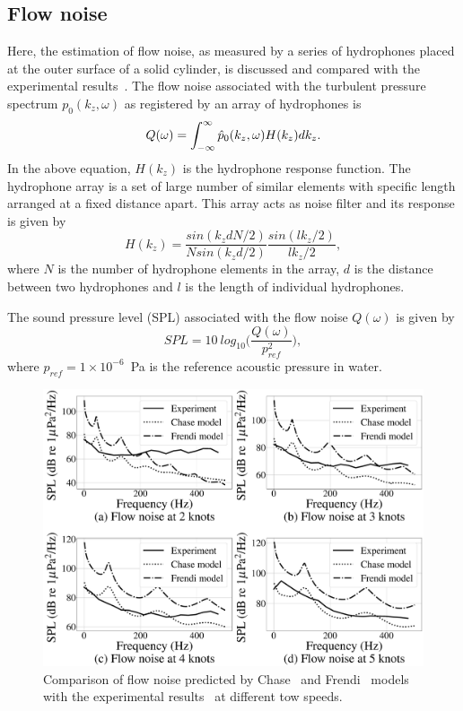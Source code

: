 \documentclass[11pt,cleanfoot]{asme2ej}
\begin{document}
\subsection{Flow noise} \label{sec:flownoise}
Here, the estimation of flow noise, as measured by a series of hydrophones placed at the outer surface of a solid cylinder, is discussed and compared with the experimental results~\cite{Unni2011}.
The flow noise associated with the turbulent pressure spectrum $p_{0}(k_{z},\omega)$ as registered by an array of hydrophones is~\cite{Unni2011} 
\begin{equation}\label{Flow noise equaton from Unni}
    Q(\omega) = \int_{-\infty}^{\infty} \Hat{p}_{0}(k_{z},\omega)H(k_{z})dk_{z}.
\end{equation}
In the above equation, $H(k_{z})$ is the hydrophone response function. The hydrophone array is a set of large number of similar elements with specific length arranged at a fixed distance apart. This array acts as noise filter and its response is given by \cite{Unni2011} 
\begin{equation}\label{Hydrophone response equation from Unni}
    H(k_{z}) = \frac{sin(k_{z}dN/2)}{Nsin(k_{z}d/2)}\frac{sin(lk_{z}/2)}{lk_{z}/2},
\end{equation}
where $N$ is the number of hydrophone elements in the array, $d$ is the distance between two hydrophones and $l$ is the length of individual hydrophones.

The sound pressure level (SPL) associated with the flow noise $Q(\omega)$ is given by
\begin{equation}\label{SPL outside noise}
SPL = 10~log_{10}\bigg(\frac{Q(\omega)}{p_{ref}^2}\bigg),
\end{equation}
where $p_{ref} = 1\times10^{-6}$~Pa is the reference acoustic pressure in water. 


\begin{figure}
    \centerline{\includegraphics[width=4.5in]{Chase,frendi_vs_Unni_comparison.eps}}
    \caption{Comparison of flow noise predicted by Chase~\cite{Chase1981} and Frendi~\cite{frendi2020} models with the experimental results~\cite{Unni2011} at different tow speeds.}
    \label{Chase,frendi,expt}
\end{figure}
 
\end{document}
